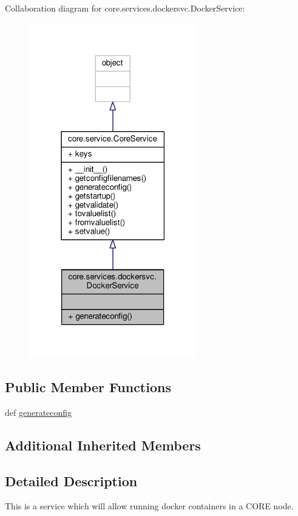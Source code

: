 Collaboration diagram for core.\+services.\+dockersvc.\+Docker\+Service\+:
\nopagebreak
\begin{figure}[H]
\begin{center}
\leavevmode
\includegraphics[width=207pt]{classcore_1_1services_1_1dockersvc_1_1_docker_service__coll__graph}
\end{center}
\end{figure}
\subsection*{Public Member Functions}
\begin{DoxyCompactItemize}
\item 
def \hyperlink{classcore_1_1services_1_1dockersvc_1_1_docker_service_a8f56eb1033e61213126be351446a632a}{generateconfig}
\end{DoxyCompactItemize}
\subsection*{Additional Inherited Members}


\subsection{Detailed Description}
\begin{DoxyVerb}This is a service which will allow running docker containers in a CORE
    node. 
\end{DoxyVerb}
 

